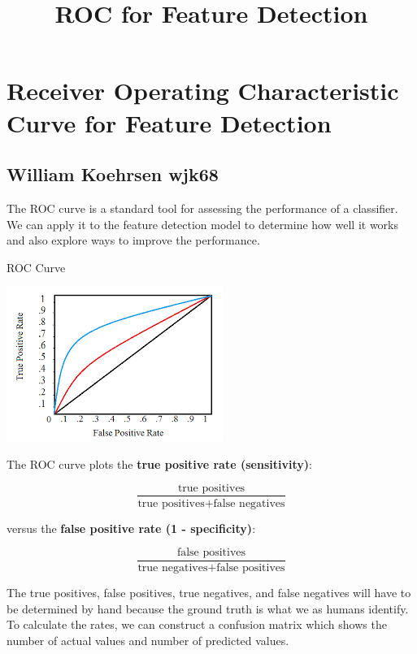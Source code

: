 \documentclass[11pt]{article}
\title{ROC for Feature Detection}
\makeatletter
\def\maxwidth{\ifdim\Gin@nat@width>\linewidth\linewidth
    \else\Gin@nat@width\fi}
\let\Oldincludegraphics\includegraphics
\renewcommand{\includegraphics}[1]{\Oldincludegraphics[width=.8\maxwidth]{#1}}
\makeatother
\begin{document}
    
    
    \maketitle
    
    

    
    \hypertarget{receiver-operating-characteristic-curve-for-feature-detection}{%
\section{Receiver Operating Characteristic Curve for Feature
Detection}\label{receiver-operating-characteristic-curve-for-feature-detection}}

\hypertarget{william-koehrsen-wjk68}{%
\subsection{William Koehrsen wjk68}\label{william-koehrsen-wjk68}}

The ROC curve is a standard tool for assessing the performance of a
classifier. We can apply it to the feature detection model to determine
how well it works and also explore ways to improve the performance.

    ROC Curve

\includegraphics{images/roc_simple.png}

    The ROC curve plots the \textbf{true positive rate (sensitivity)}:

\[\frac{\text{true positives}}{\text{true positives} + \text{false negatives}}\]

versus the \textbf{false positive rate (1 - specificity)}:

\[\frac{\text{false positives}}{\text{true negatives} + \text{false positives}}\]

The true positives, false positives, true negatives, and false negatives
will have to be determined by hand because the ground truth is what we
as humans identify. To calculate the rates, we can construct a confusion
matrix which shows the number of actual values and number of predicted
values.
\end{document}
